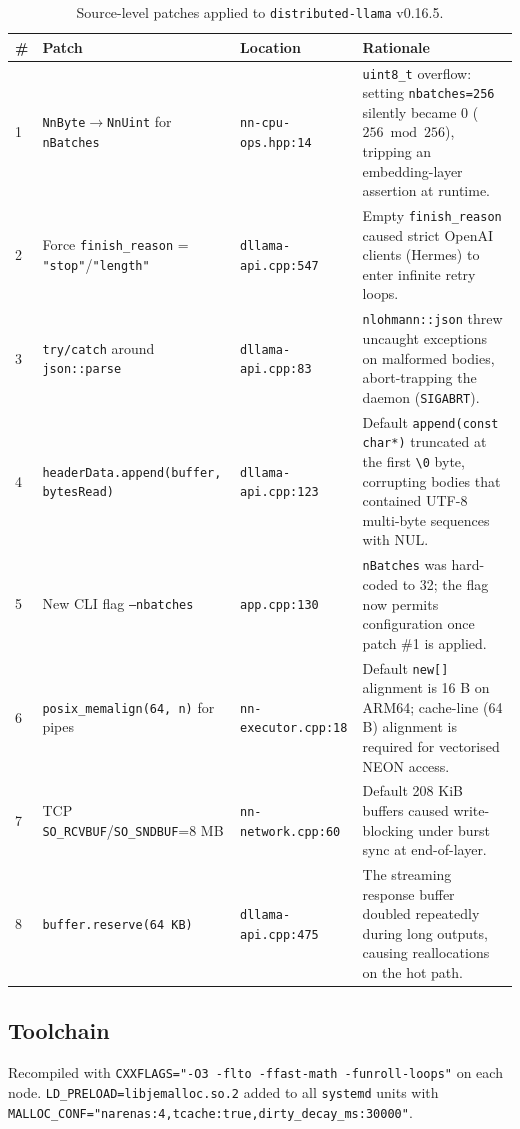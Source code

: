 \documentclass[10pt,a4paper]{article}
\begin{document}
\begin{table}[H]
\centering
\caption{Source-level patches applied to \texttt{distributed-llama} v0.16.5.}
\scriptsize
\begin{tabular}{p{0.3cm}p{4cm}p{3cm}p{6cm}}
\toprule
\# & \textbf{Patch} & \textbf{Location} & \textbf{Rationale} \\
\midrule
1 & \texttt{NnByte}$\rightarrow$\texttt{NnUint} for \texttt{nBatches} & \texttt{nn-cpu-ops.hpp:14} & \texttt{uint8\_t} overflow: setting \texttt{nbatches=256} silently became 0 ($256 \bmod 256$), tripping an embedding-layer assertion at runtime. \\
2 & Force \texttt{finish\_reason} = \texttt{"stop"}/\texttt{"length"} & \texttt{dllama-api.cpp:547} & Empty \texttt{finish\_reason} caused strict OpenAI clients (Hermes) to enter infinite retry loops. \\
3 & \texttt{try/catch} around \texttt{json::parse} & \texttt{dllama-api.cpp:83} & \texttt{nlohmann::json} threw uncaught exceptions on malformed bodies, abort-trapping the daemon (\texttt{SIGABRT}). \\
4 & \texttt{headerData.append(buffer, bytesRead)} & \texttt{dllama-api.cpp:123} & Default \texttt{append(const char*)} truncated at the first \texttt{\textbackslash0} byte, corrupting bodies that contained UTF-8 multi-byte sequences with NUL. \\
5 & New CLI flag \texttt{--nbatches} & \texttt{app.cpp:130} & \texttt{nBatches} was hard-coded to 32; the flag now permits configuration once patch \#1 is applied. \\
6 & \texttt{posix\_memalign(64, n)} for pipes & \texttt{nn-executor.cpp:18} & Default \texttt{new[]} alignment is 16 B on ARM64; cache-line (64 B) alignment is required for vectorised NEON access. \\
7 & TCP \texttt{SO\_RCVBUF}/\texttt{SO\_SNDBUF}=8 MB & \texttt{nn-network.cpp:60} & Default 208 KiB buffers caused write-blocking under burst sync at end-of-layer. \\
8 & \texttt{buffer.reserve(64 KB)} & \texttt{dllama-api.cpp:475} & The streaming response buffer doubled repeatedly during long outputs, causing reallocations on the hot path. \\
\bottomrule
\end{tabular}
\end{table}

\subsection{Toolchain}
Recompiled with \texttt{CXXFLAGS="-O3 -flto -ffast-math -funroll-loops"} on each node. \texttt{LD\_PRELOAD=libjemalloc.so.2} added to all \texttt{systemd} units with \texttt{MALLOC\_CONF="narenas:4,tcache:true,dirty\_decay\_ms:30000"}.
\end{document}
